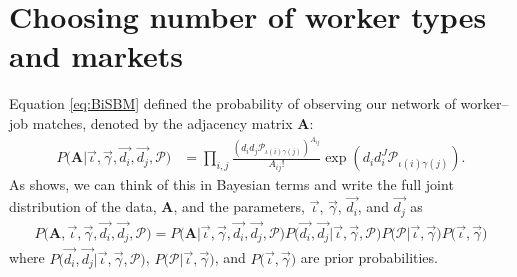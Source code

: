 \documentclass[12pt]{article}
\def\g{\gamma}
\def\i{\iota}
\theoremstyle{definition}
\theoremstyle{plain}
\begin{document}
\section{Choosing number of worker types and markets}

\label{sec:MDL_details}


Equation \ref{eq:BiSBM} defined the probability of observing our network of worker--job matches, denoted by the adjacency matrix $\mathbf{A}$:
\begin{align} 
P \bigg(\mathbf{A} \bigg|\vec{\i}, \vec{\g}, \vec{d_i}, \vec{d_j} , \mathbf{\mathcal{P}} \bigg)  
&= \prod_{ i,j } \frac{\left(d_i d_j \mathcal{P}_{\i(i)\g(j)}\right)^{A_{ij}}}{A_{ij}!} \exp \left(d_i d_i^J \mathcal{P}_{\i(i)\g(j)} \right) . 
\end{align} 
As \citet{Peixoto2017} shows, we can think of this in Bayesian terms and write the full joint distribution of the data, $\mathbf{A}$, and the parameters,  $\vec{\i}$, $\vec{\g}$, $\vec{d_i}$, and $\vec{d_j}$ as 
\begin{align} 
P \bigg(\mathbf{A}, \vec{\i}, \vec{\g}, \vec{d_i}, \vec{d_j} , \mathbf{\mathcal{P}} \bigg) = 
P \bigg(\mathbf{A} \bigg|\vec{\i}, \vec{\g}, \vec{d_i}, \vec{d_j} , \mathbf{\mathcal{P}} \bigg)   
P \bigg(\vec{d_i}, \vec{d_j}  \bigg|\vec{\i}, \vec{\g}, \mathbf{\mathcal{P}} \bigg) 
P \bigg(\mathbf{\mathcal{P}} \bigg|\vec{\i}, \vec{\g} \bigg)  
P \bigg(\vec{\i}, \vec{\g} \bigg)    \label{eq:bisbm_bayesian}
\end{align}
where $P \bigg(\vec{d_i}, \vec{d_j}  \bigg|\vec{\i}, \vec{\g}, \mathbf{\mathcal{P}} \bigg) $, $P \bigg(\mathbf{\mathcal{P}} \bigg|\vec{\i}, \vec{\g} \bigg)$, and $P \bigg(\vec{\i}, \vec{\g} \bigg) $ are prior probabilities. 
\end{document}
